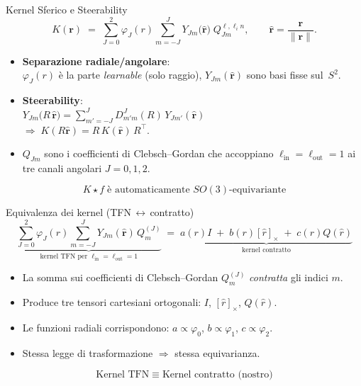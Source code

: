 \documentclass[aspectratio=64,8pt]{beamer}
\begin{document}
\begin{frame}[fragile]{Kernel Sferico e Steerability}
\[
  K(\mathbf r)
  \;=\;
  \sum_{J=0}^{2} \varphi_J(r)
  \sum_{m=-J}^{J}
  Y_{Jm}\!\bigl(\hat{\mathbf r}\bigr)\;
  Q_{Jm}^{\ell,\ell_in},
  \qquad
  \hat{\mathbf r}=\frac{\mathbf r}{\lVert\mathbf r\rVert}.
\]

\begin{itemize}
  \item \textbf{Separazione radiale/angolare}:\\[2pt]
        \(\varphi_J(r)\) è la parte \emph{learnable} (solo raggio),  
        \(Y_{Jm}(\hat{\mathbf r})\) sono basi fisse sul \(S^2\).
  \item \textbf{Steerability}:\\[2pt]
        \(Y_{Jm}\bigl(R\,\hat{\mathbf r}\bigr)
        =\displaystyle\sum_{m'=-J}^{J} D^{J}_{m'm}(R)\,Y_{Jm'}(\hat{\mathbf r})\)\\
        \(\Longrightarrow\;
        K(R\hat{\mathbf r}) = R\,K(\hat{\mathbf r})\,R^{\!\top}\).
  \item \(Q_{Jm}\) sono i coefficienti di Clebsch–Gordan che accoppiano
        \(\ell_{\text{in}}=\ell_{\text{out}}=1\) 
        ai tre canali angolari \(J=0,1,2\).
\end{itemize}

\[
  \boxed{\;K\star f \;\text{è automaticamente }SO(3)\text{-equivariante}\;}
\]
\end{frame}


\begin{frame}[fragile]{Equivalenza dei kernel (TFN\,$\leftrightarrow$\,contratto)}
\[
\underbrace{\sum_{\scriptstyle J=0}^{2}\!\varphi_J(r)\sum_{m=-J}^{J}Y_{Jm}(\hat{\mathbf r})\,Q^{(J)}_{m}}_{\text{kernel TFN per }\ell_{\text{in}}=\ell_{\text{out}}=1}
\;=\;
\underbrace{a(r)I\; +\; b(r)[\hat r]_\times\; +\; c(r)Q(\hat r)}_{\text{kernel contratto}}
\]
\vspace{0.5em}
\begin{itemize}
  \item La somma sui coefficienti di Clebsch--Gordan $Q^{(J)}_{m}$ \emph{contratta} gli indici $m$.
  \item Produce tre tensori cartesiani ortogonali: $I$, $[\hat r]_\times$, $Q(\hat r)$.
  \item Le funzioni radiali corrispondono: $a\!\propto\!\varphi_0$, $b\!\propto\!\varphi_1$, $c\!\propto\!\varphi_2$.
  \item Stessa legge di trasformazione $\Rightarrow$ stessa equivarianza.
\end{itemize}
\vspace{-0.5em}
\[
\boxed{\text{Kernel TFN}\;\equiv\;\text{Kernel contratto (nostro)}}
\]
\end{frame}
\end{document}
